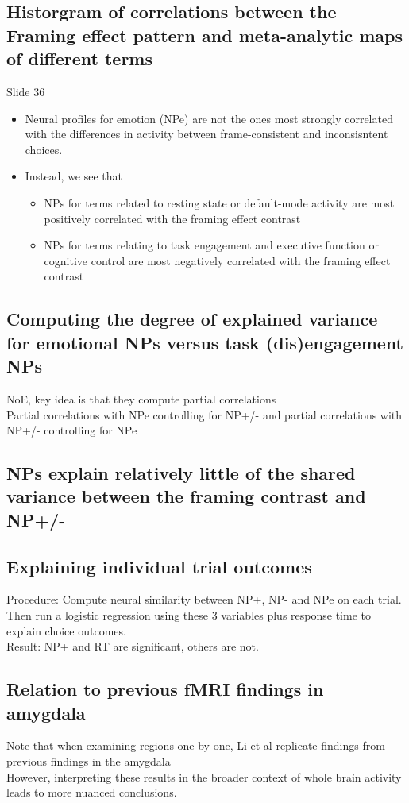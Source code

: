 \subsection{Historgram of correlations between the Framing effect pattern and meta-analytic maps of different terms}
Slide 36
\begin{itemize}
    \item Neural profiles for emotion (NPe) are not the ones most strongly correlated with the differences in activity between frame-consistent and inconsisntent choices.
    \item Instead, we see that
    \begin{itemize}
        \item NPs for terms related to resting state or default-mode activity are most positively correlated with the framing effect contrast
        \item NPs for terms relating to task engagement and executive function or cognitive control are most negatively correlated with the framing effect contrast
    \end{itemize}
\end{itemize}
\subsection{Computing the degree of explained variance for emotional NPs versus task (dis)engagement NPs}
NoE, key idea is that they compute partial correlations
\\Partial correlations with NPe controlling for NP+/- and partial correlations with NP+/- controlling for NPe

\subsection{NPs explain relatively little of the shared variance between the framing contrast and NP+/-}
\subsection{Explaining individual trial outcomes}
Procedure: Compute neural similarity between NP+, NP- and NPe on each trial. Then run a logistic regression using these 3 variables plus response time to explain choice outcomes.
\\Result: NP+ and RT are significant, others are not.
\subsection{Relation to previous fMRI findings in amygdala}
Note that when examining regions one by one, Li et al replicate findings from previous findings in the amygdala
\\However, interpreting these results in the broader context of whole brain activity leads to more nuanced conclusions.
